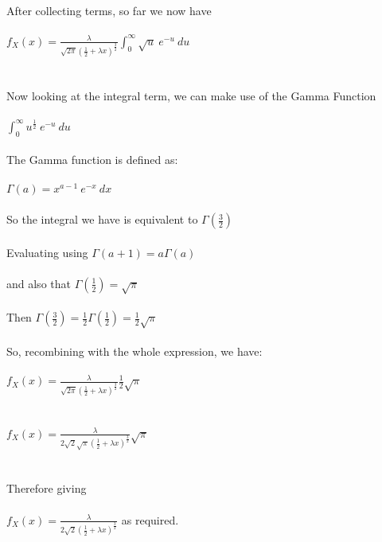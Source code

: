 \documentclass[11pt]{article}   	%
\begin{document}
\\\\
After collecting terms, so far we now have \\
\\
$ f_X(x) = \frac{ \lambda }{ \sqrt { 2 \pi } (\frac{1}{2} + \lambda x)^{\frac{3}{2}} } \displaystyle \int_{0}^{\infty} \sqrt { u } \ e^{ -u } \ du $ \\
\\\\
Now looking at the integral term, we can make use of the Gamma Function \\
\\
$ \displaystyle \int_{0}^{\infty} u^{\frac{1}{2}} \ e^{ -u } \ du $ \\
\\
The Gamma function is defined as: \\
\\
$ \Gamma(a) = x^{a-1} \ e^{-x} \ dx $ \\
\\
So the integral we have is equivalent to $ \Gamma(\frac{3}{2}) $ \\
\\
Evaluating using $ \Gamma(a + 1) = a \Gamma(a) $ \\
\\
and also that $ \Gamma(\frac{1}{2}) = \sqrt{\pi} $ \\
\\
Then $ \Gamma(\frac{3}{2}) = \frac{1}{2} \Gamma(\frac{1}{2}) = \frac{1}{2} \sqrt{\pi} $ \\
\\
So, recombining with the whole expression, we have: \\
\\
$ f_X(x) = \frac{ \lambda }{ \sqrt { 2 \pi } (\frac{1}{2} + \lambda x) ^{\frac{3}{2}} } \frac{1}{2} \sqrt{\pi} $ \\
\\\\
$ f_X(x) = \frac{ \lambda }{ 2 \sqrt { 2 } \sqrt { \pi } (\frac{1}{2} + \lambda x)^{\frac{3}{2}} } \sqrt{\pi} $ \\
\\\\
Therefore giving \\
\\
$ f_X(x) = \frac{ \lambda }{ 2 \sqrt { 2 } (\frac{1}{2} + \lambda x)^{\frac{3}{2}} } $ as required. \\
\\


\break
\end{document}
